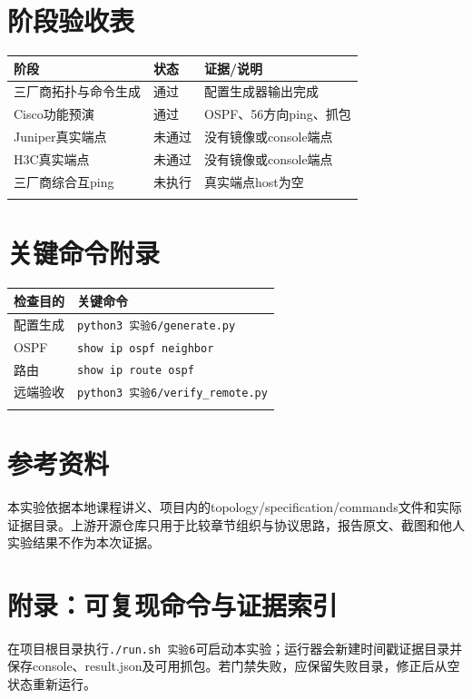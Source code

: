 \documentclass[UTF8,a4paper,12pt]{ctexart}
\begin{document}
\section{阶段验收表}
\begin{longtable}{p{}p{}p{}}\toprule 阶段 & 状态 & 证据/说明\\\midrule
三厂商拓扑与命令生成 & 通过 & 配置生成器输出完成\\
Cisco功能预演 & 通过 & OSPF、56方向ping、抓包\\
Juniper真实端点 & 未通过 & 没有镜像或console端点\\
H3C真实端点 & 未通过 & 没有镜像或console端点\\
三厂商综合互ping & 未执行 & 真实端点host为空\\\\\bottomrule\end{longtable}
\section{关键命令附录}
\begin{longtable}{p{}p{}}\toprule 检查目的 & 关键命令\\\midrule
配置生成 & \texttt{python3 实验6/generate.py}\\
OSPF & \texttt{show ip ospf neighbor}\\
路由 & \texttt{show ip route ospf}\\
远端验收 & \texttt{python3 实验6/verify\_remote.py}\\\\\bottomrule\end{longtable}
\section{参考资料}
本实验依据本地课程讲义、项目内的topology/specification/commands文件和实际证据目录。上游开源仓库只用于比较章节组织与协议思路，报告原文、截图和他人实验结果不作为本次证据。
\section{附录：可复现命令与证据索引}
在项目根目录执行\texttt{./run.sh 实验6}可启动本实验；运行器会新建时间戳证据目录并保存console、result.json及可用抓包。若门禁失败，应保留失败目录，修正后从空状态重新运行。
\end{document}
